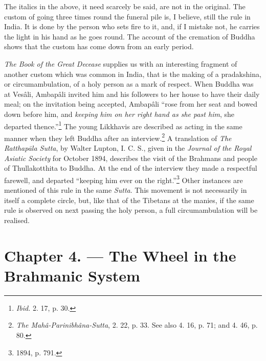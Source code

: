 \documentclass[a4paper, 11pt, oneside, polutonikogreek, english]{article}
\begin{document}
The italics in the above, it need scarcely be said, are not in the original. The custom of going three times round the funeral pile is, I believe, still the rule in India. It is done by the person who sets fire to it, and, if I mistake not, he carries the light in his hand as he goes round. The account of the cremation of Buddha shows that the custom has come down from an early period.

\emph{The Book of the Great Decease} supplies us with an interesting fragment of another custom which was common in India, that is the making of a pradakshina, or circumambulation, of a holy person as a mark of respect. When Buddha was at Vesâli, Ambapâli invited him and his followers to her house to have their daily meal; on the invitation being accepted, Ambapâli ``rose from her seat and bowed down before him, and \emph{keeping him on her right hand as she past him}, she departed thence.''\footnote{\emph{Ibid.} 2. 17, p. 30.} The young Likkhavis are described as acting in the same manner when they left Buddha after an interview.\footnote{\emph{The Mahâ-Parinibhâna-Sutta}, 2. 22, p. 33. See also 4. 16, p. 71; and 4. 46, p. 80.} A translation of \emph{The Ratthapāla Sutta}, by Walter Lupton, I. C. S., given in the \emph{Journal of the Royal Asiatic Society} for October 1894, describes the visit of the Brahmans and people of Thullakotthita to Buddha. At the end of the interview they made a respectful farewell, and departed ``keeping him ever on the right.''\footnote{1894, p. 791.} Other instances are mentioned of this rule in the same \emph{Sutta}. This movement is not necessarily in itself a complete circle, but, like that of the Tibetans at the manies, if the same rule is observed on next passing the holy person, a full circumambulation will be realised.
\clearpage
\section{Chapter 4. --- The Wheel in the Brahmanic System}
\end{document}
